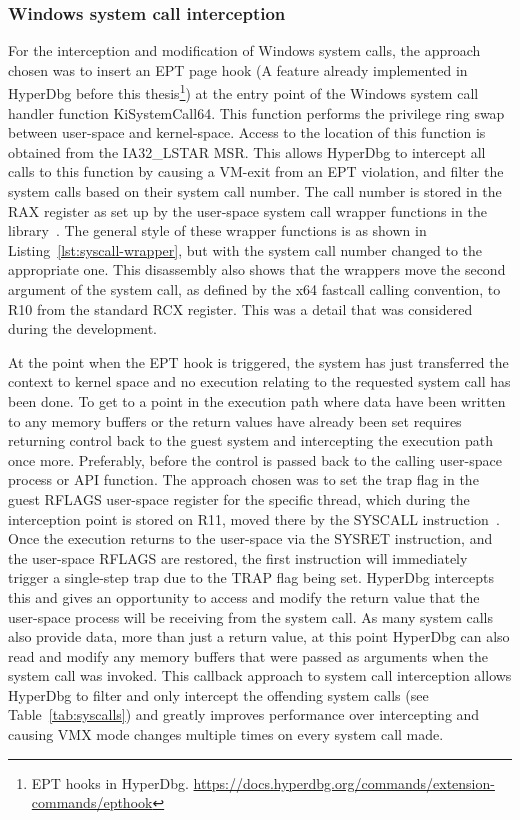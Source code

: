 \subsubsection{Windows system call interception}\label{syscall_interception}
For the interception and modification of Windows system calls, the approach chosen was to insert an EPT page hook (A feature already implemented in HyperDbg before this thesis\footnote{EPT hooks in HyperDbg. \url{https://docs.hyperdbg.org/commands/extension-commands/epthook}}) 
at the entry point of the Windows system call handler function KiSystemCall64. This function performs the privilege ring swap between user-space and kernel-space. 
Access to the location of this function is obtained from the IA32\_LSTAR MSR. 
This allows HyperDbg to intercept all calls to this function by causing a VM-exit from an EPT violation, and filter the system calls based on their system call number. 
The call number is stored in the RAX register as set up by the user-space system call wrapper functions in the  library~\cite{ntdll-lib}. The general style of these 
wrapper functions is as shown in Listing~\ref{lst:syscall-wrapper}, but with the system call number changed to the appropriate one.
This disassembly also shows that the wrappers move the second argument of the system call, as defined by the x64 fastcall calling convention, 
to R10 from the standard RCX register. This was a detail that was considered during the development.

At the point when the EPT hook is triggered, the system has just transferred the context to kernel space and no execution relating to the requested system call has been done. 
To get to a point in the execution path where data have been written to any memory buffers or the return values have already been set 
requires returning control back to the guest system and intercepting the execution path once more. Preferably, before the control is passed back to the calling user-space process or API function. 
The approach chosen was to set the trap flag in the guest RFLAGS user-space register for the specific thread, which during the interception point is stored on R11, moved there by the SYSCALL instruction~\cite[Volume 2B]{Intel-SDM2025}. 
Once the execution returns to the user-space via the SYSRET instruction, and the user-space RFLAGS are restored, the first instruction will immediately trigger a single-step trap due to the TRAP flag
being set. HyperDbg intercepts this and gives an opportunity to access and modify the return value that the user-space process will be receiving from the system call. 
As many system calls also provide data, more than just a return value, at this point HyperDbg can also read and modify any memory buffers that were 
passed as arguments when the system call was invoked. This callback approach to system call interception allows HyperDbg to filter and only intercept 
the offending system calls (see Table~\ref{tab:syscalls}) and greatly improves performance over intercepting and causing VMX mode changes multiple times on every system call made.

